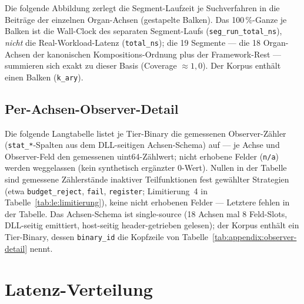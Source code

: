 Die folgende Abbildung zerlegt die Segment-Laufzeit je Suchverfahren in die Beiträge der einzelnen
Organ-Achsen (gestapelte Balken). Das 100\,\%-Ganze je Balken ist die Wall-Clock des separaten
Segment-Laufs (\texttt{seg\_run\_total\_ns}), \emph{nicht} die Real-Workload-Latenz
(\texttt{total\_ns}); die 19 Segmente --- die 18 Organ-Achsen der kanonischen Kompositions-Ordnung
plus der Framework-Rest --- summieren sich exakt zu dieser Basis (Coverage $\approx 1{,}0$). Der
Korpus enthält einen Balken (\texttt{k\_ary}).


\subsection{Per-Achsen-Observer-Detail}\label{sec:measurements:observer-detail}

Die folgende Langtabelle listet je Tier-Binary die gemessenen Observer-Zähler
(\texttt{stat\_*}-Spalten aus dem DLL-seitigen Achsen-Schema) auf --- je Achse und Observer-Feld
den gemessenen uint64-Zählwert; nicht erhobene Felder (\texttt{n/a}) werden weggelassen (kein
synthetisch ergänzter 0-Wert). Nullen in der Tabelle sind gemessene Zählerstände inaktiver Teilfunktionen
fest gewählter Strategien (etwa \texttt{budget\_reject}, \texttt{fail}, \texttt{register};
Limitierung~4 in Tabelle~\ref{tab:le:limitierung}), keine nicht erhobenen Felder --- Letztere fehlen
in der Tabelle. Das Achsen-Schema ist single-source (18 Achsen mal 8 Feld-Slots, DLL-seitig
emittiert, host-seitig header-getrieben gelesen); der Korpus enthält ein Tier-Binary, dessen
\texttt{binary\_id} die Kopfzeile von Tabelle~\ref{tab:appendix:observer-detail} nennt.


\section{Latenz-Verteilung}\label{sec:measurements:latency-distribution}

